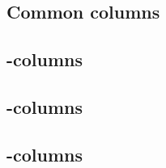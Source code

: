 \subsection{Common columns}            
\subsection{\computation{}-columns}    
\subsection{\macro{}-columns}          
\subsection{\utils{}-columns}          
